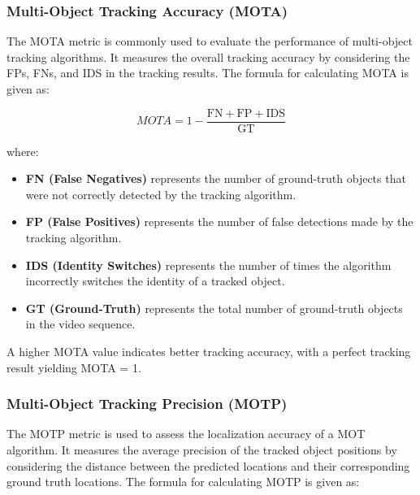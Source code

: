 \subsubsection{Multi-Object Tracking Accuracy (MOTA)}
\label{subsubsec:4_MOTA}

The \acf{MOTA} metric is commonly used to evaluate the performance of multi-object tracking algorithms. It measures the overall tracking accuracy by considering the \acp{FP}, \acp{FN}, and \ac{IDS} in the tracking results. The formula for calculating \ac{MOTA} is given as:

\begin{equation}
	MOTA = 1 - \frac{{\text{{FN}} + \text{{FP}} + \text{{IDS}}}}{{\text{{GT}}}}
\end{equation}

where:

\begin{itemize}
	
	\item \textbf{FN (False Negatives)} represents the number of ground-truth objects that were not correctly detected by the tracking algorithm.
	
	\item \textbf{FP (False Positives)} represents the number of false detections made by the tracking algorithm.
	
	\item \textbf{IDS (Identity Switches)} represents the number of times the algorithm incorrectly switches the identity of a tracked object.
	
	\item \textbf{GT (Ground-Truth)} represents the total number of ground-truth objects in the video sequence.
	
\end{itemize}

A higher \ac{MOTA} value indicates better tracking accuracy, with a perfect tracking result yielding MOTA = 1.

\subsubsection{Multi-Object Tracking Precision (MOTP)}
\label{subsubsec:4_MOTP}

The \acf{MOTP} metric is used to assess the localization accuracy of a \ac{MOT} algorithm. It measures the average precision of the tracked object positions by considering the distance between the predicted locations and their corresponding ground truth locations. The formula for calculating \ac{MOTP} is given as:

